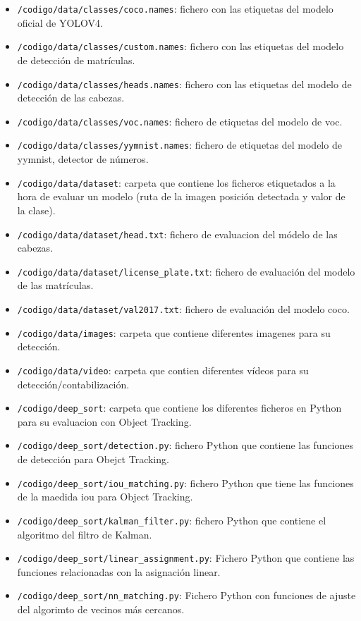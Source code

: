\begin{itemize}
    \item \texttt{/codigo/data/classes/coco.names}: fichero con las etiquetas del modelo oficial de YOLOV4.
    \item \texttt{/codigo/data/classes/custom.names}: fichero con las etiquetas del modelo de detección de matrículas.
    \item \texttt{/codigo/data/classes/heads.names}: fichero con las etiquetas del modelo de detección de las cabezas.
    \item \texttt{/codigo/data/classes/voc.names}: fichero de etiquetas del modelo de voc.
    \item \texttt{/codigo/data/classes/yymnist.names}: fichero de etiquetas del modelo de yymnist, detector de números.
    \item \texttt{/codigo/data/dataset}: carpeta que contiene los ficheros etiquetados a la hora de evaluar un modelo (ruta de la imagen posición detectada y valor de la clase).
    \item \texttt{/codigo/data/dataset/head.txt}: fichero de evaluacion del módelo de las cabezas. 
    \item \texttt{/codigo/data/dataset/license\_plate.txt}: fichero de evaluación del modelo de las matrículas.
    \item \texttt{/codigo/data/dataset/val2017.txt}: fichero de evaluación del modelo coco.
    \item \texttt{/codigo/data/images}: carpeta que contiene diferentes imagenes para su detección.
    \item \texttt{/codigo/data/video}: carpeta que contien diferentes vídeos para su detección/contabilización.
    \item \texttt{/codigo/deep\_sort}: carpeta que contiene los diferentes ficheros en Python para su evaluacion con Object Tracking.
    \item \texttt{/codigo/deep\_sort/detection.py}: fichero Python que contiene las funciones de detección para Obejct Tracking.
    \item \texttt{/codigo/deep\_sort/iou\_matching.py}: fichero Python que tiene las funciones de la maedida iou para Object Tracking.
    \item \texttt{/codigo/deep\_sort/kalman\_filter.py}: fichero Python que contiene el algoritmo del filtro de Kalman\cite{kalman_filter}.  
    \item \texttt{/codigo/deep\_sort/linear\_assignment.py}: Fichero Python que contiene las funciones relacionadas con la asignación linear.
    \item \texttt{/codigo/deep\_sort/nn\_matching.py}: Fichero Python con funciones de ajuste del algorimto de vecinos más cercanos\cite{knn}.

\end{itemize}
